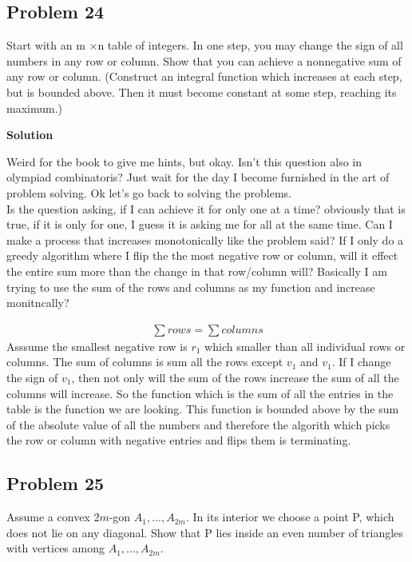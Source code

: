 \documentclass[12pt,tikz,border=10pt]{article}
\theoremstyle{definition}
\theoremstyle{remark}
\begin{document}
\subsection{Problem 24}

Start with an m ×n table of integers. In one step, you may change the sign of all numbers in any row or column. Show that you can achieve a nonnegative sum of any  row or column. (Construct an integral function which increases at each step, but is
bounded above. Then it must become constant at some step, reaching its maximum.)

\textbf{Solution}

Weird for the book to give me hints, but okay. Isn't this question also in 
olympiad combinatoris? Just wait for the day I become furnished in the art of 
problem solving. Ok let's go back to solving the problems.\\

Is the question asking, if I can achieve it for only one at a time? obviously that 
is true, if it is only for one, I guess it is asking me for all at the same time.
Can I make a process that increases monotonically like the problem said?
If I only do a greedy algorithm where I flip the the most negative row or column, will
it effect the entire sum more than the change in that row/column will? Basically I 
am trying to use the sum of the rows and columns as my function and increase monitncally?

\begin{align*}
    \sum{rows}=\sum{columns}
\end{align*}
Asssume the smallest negative row is $r_1$ which smaller than all individual rows or columns.
The sum of columns is sum all the rows except $v_1$ and $v_1$. If I change the sign of $v_1$, then 
not only will the sum of the rows increase the sum of all the columns will increase. So the function
which is the sum of all the entries in the table is the function we are looking. This function is bounded above by
the sum of the absolute value of all the numbers and therefore the algorith which picks 
the row or column with negative entries and flips them is terminating. 

\subsection{Problem 25}

Assume a convex 2$m$-gon $A_1, . . . , A_{2m}$. In its interior we choose a point P, which
does not lie on any diagonal. Show that P lies inside an even number of triangles
with vertices among $A_1, . . . , A_{2m}$.
\end{document}
